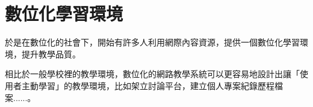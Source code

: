 \renewcommand{\baselinestretch}{20} %
\section{數位化學習環境}
\par
\renewcommand{\baselinestretch}{1} %
\twelve \qquad 於是在數位化的社會下，開始有許多人利用網際內容資源，提供一個數位化學習環境，提升教學品質。\\
\par
\renewcommand{\baselinestretch}{1} %
\twelve \hspace{0.5em} 相比於一般學校裡的教學環境，數位化的網路教學系統可以更容易地設計出讓「使用者主動學習」的教學環境，比如架立討論平台，建立個人專案紀錄歷程檔案......。
\par

\renewcommand{\baselinestretch}{20} %
